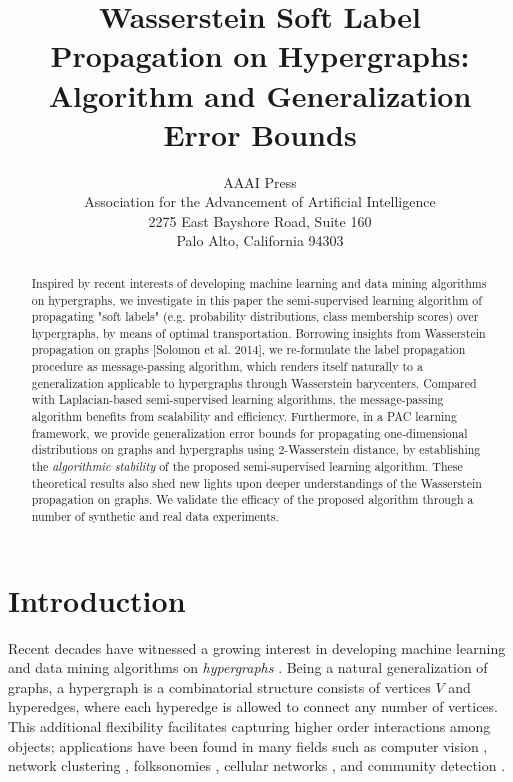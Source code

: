 \documentclass[letterpaper]{article} %
\begin{document}
\title{Wasserstein Soft Label Propagation on Hypergraphs: Algorithm and Generalization Error Bounds}
\author{AAAI Press\\
Association for the Advancement of Artificial Intelligence\\
2275 East Bayshore Road, Suite 160\\
Palo Alto, California 94303\\
}
\maketitle

\begin{abstract}
Inspired by recent interests of developing machine learning and data mining algorithms on hypergraphs, we investigate in this paper the semi-supervised learning algorithm of propagating "soft labels" (e.g. probability distributions, class membership scores) over hypergraphs, by means of optimal transportation. Borrowing insights from Wasserstein propagation on graphs [Solomon et al. 2014], we re-formulate the label propagation procedure as message-passing algorithm, which renders itself naturally to a generalization applicable to hypergraphs through Wasserstein barycenters. Compared with Laplacian-based semi-supervised learning algorithms, the message-passing algorithm benefits from scalability and efficiency. Furthermore, in a PAC learning framework, we provide generalization error bounds for propagating one-dimensional distributions on graphs and hypergraphs using 2-Wasserstein distance, by establishing the \textit{algorithmic stability} of the proposed semi-supervised learning algorithm. These theoretical results also shed new lights upon deeper understandings of the Wasserstein propagation on graphs. We validate the efficacy of the proposed algorithm through a number of synthetic and real data experiments.
\end{abstract}
	
\section{Introduction}
Recent decades have witnessed a growing interest in developing machine learning and data mining algorithms on \emph{hypergraphs} \cite{Hypergraph_Clustering,Hypergraph_Jost,Hypergraph_Game,Hypergraph_Kannan,Hypergraph_Olgica,Hypergraph_TV,HypergraphScalable}. Being a natural generalization of graphs, a hypergraph is a combinatorial structure consists of vertices $V$ and hyperedges, where each hyperedge is allowed to connect any number of vertices. This additional flexibility facilitates capturing higher order interactions among objects; applications have been found in many fields such as computer vision \cite{Govindu2005}, network clustering \cite{Hyper_Spatial}, folksonomies \cite{GZCN2009}, cellular networks \cite{KHT2009}, and community detection \cite{KBG2018}.
\end{document}
